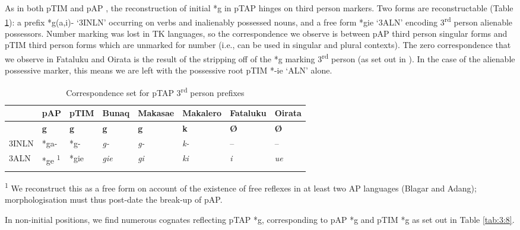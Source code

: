 As in both pTIM \citep[213-214]{SchapperEtAl2012} and pAP \citep[98]{HoltonEtAl2012}, the reconstruction of initial *g in pTAP hinges on third person markers. Two forms are reconstructable (Table \ref{tab:3:7}): a prefix *g(a,i)- `3INLN' occurring on verbs and inalienably possessed nouns, and a free form *gie `3ALN' encoding 3\textsuperscript{rd} person alienable possessors. Number marking was lost in TK languages, so the correspondence we observe is between pAP third person singular forms and pTIM third person forms which are unmarked for number (i.e., can be used in singular and plural contexts). The zero correspondence that we observe in Fataluku and Oirata is the result of the stripping off of the *g marking 3\textsuperscript{rd} person (as set out in \citealt[214]{SchapperEtAl2012}). In the case of the alienable possessive marker, this means we are left with the possessive root pTIM *-ie `ALN' alone.
 

\begin{table}
\caption{Correspondence set for pTAP 3\textsuperscript{rd} person prefixes}
\label{tab:3:7}  
\begin{tabular}{llllllll}
\mytoprule
 & pAP & pTIM & Bunaq & Makasae & Makalero & Fataluku & Oirata\\
\midrule
 & {\bfseries *g} & {\bfseries *g} & {\bfseries g} & {\bfseries g} & {\bfseries k} & {\bfseries {\O}} & {\bfseries {\O}}\\
3INLN & *ga- & *g- & {\itshape g-} & {\itshape g-} & {\itshape k-} & -- & --\\
3ALN & *ge \textsuperscript{1} & *gie & {\itshape gie} & {\itshape gi} & {\itshape ki} & {\itshape i} & {\itshape ue}\\
\mybottomrule
\end{tabular} 

\textsuperscript{1} We reconstruct this as a free form on account of the existence of free reflexes in at least two AP languages (Blagar and Adang); morphologisation must thus post-date the break-up of pAP. 

\end{table}
In non-initial positions, we find numerous cognates reflecting pTAP *g, corresponding to pAP *g and pTIM *g as set out in Table \ref{tab:3:8}. 
 

